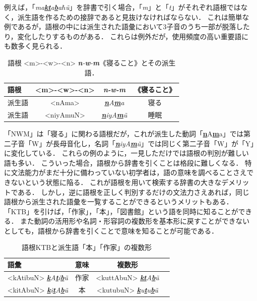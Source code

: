 \documentclass[technicalreport]{ieicej}
\begin{document}
例えば，「\textit{ma\underline{\textbf{k}}\underline{\textbf{t}}a\underline{\textbf{b}}a$\hbar$\~u}」を辞書で引く場合，「\textit{m}」と「\textit{t}」がそれぞれ語根ではなく，派生語を作るための接辞であると見抜けなければならない．
これは簡単な例であるが，語根の中には派生された語彙において3子音のうち一部が脱落したり，変化したりするものがある．
これらは例外だが，使用頻度の高い重要語にも数多く見られる．

\begin{table}[ht]
\begin{center}
\begin{tabular}{l|ccc}
   語根 & <m>-<w>-<n>&\textit{\textbf{n}-\textbf{w}-\textbf{m}} & 《寝ること》\\
  \hline
 派生語& <nAma>&\textit{\underline{\textbf{n}}A\underline{\textbf{m}}a} & 寝る\footnotemark\\
  派生語& <niyAmuN>&\textit{\underline{\textbf{n}}iyA\underline{\textbf{m}}\~u} & 睡眠\\
\hline
\end{tabular}
\caption{語根 <m>-<w>-<n> \textit{\textbf{n}-\textbf{w}-\textbf{m}}《寝ること》とその派生語．}

\label{table:alignment}
\end{center}
\end{table}
「NWM」は「寝る」に関わる語根だが，これが派生した動詞「{\underline{\textbf{n}}A\underline{\textbf{m}}a}」では第二子音「W」が長母音化し，名詞「\textit{\underline{\textbf{n}}iyA\underline{\textbf{m}}\~u}」では同じく第二子音「W」が「Y」に変化している．
これらの例のように，一見しただけでは語根の判別が難しい語も多い．
こういった場合，語根から辞書を引くことは格段に難しくなる．
特に文法能力がまだ十分に備わっていない初学者は，語の意味を調べることさえできないという状態に陥る．
これが語根を用いて検索する辞書の大きなデメリットである．
しかし，逆に語根を正しく判別するだけの文法力さえあれば，同じ語根から派生された語彙を一覧することができるというメリットもある．
「KTB」を引けば，「作家」，「本」，「図書館」という語を同時に知ることができる．
また動詞の活用形や名詞・形容詞の複数形を基本形に戻すことができないとしても，語根から辞書を引くことで意味を知ることが可能である．

\begin{table}[ht]
\begin{center}
\begin{tabular}{l|ccc}
   語彙 & 意味 & 複数形\\
  \hline
  <kAtibuN> \textit{\underline{\textbf{k}}A\underline{\textbf{t}}i\underline{\textbf{b}}\~u} & 作家 & <kuttAbuN> \textit{\underline{\textbf{k}}\underline{\textbf{t}}A\underline{\textbf{b}}\~u} \\
  <kitAbuN> \textit{\underline{\textbf{k}}i\underline{\textbf{t}}A\underline{\textbf{b}}\~u} & 本 & <kutubuN>  \textit{\underline{\textbf{k}}u\underline{\textbf{t}}u\underline{\textbf{b}}\~u} \\
\hline
\end{tabular}
\caption{語根KTBと派生語「本」「作家」の複数形}
\label{table:alignment}
\end{center}
\end{table}
\end{document}
